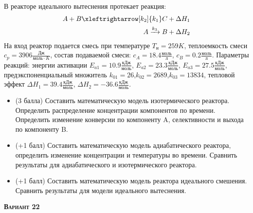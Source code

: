  В реакторе идеального вытеснения протекает реакция: \begin{equation*} \begin{aligned} A+B \xleftrightarrow[k_2]{k_1} C +\Delta H_1 \\ A \xrightarrow{k_3} B + \Delta H_2 \end{aligned} \end{equation*}                                     На вход  реактор подается смесь при температуре $ T_н =  259 K$, теплоемкость смеси $c_p= 3906 \frac{Дж}{моль \cdot K}$, состав подаваемой смеси: $c_A=18.4 \frac{моль}{л}$, $c_B=0.2 \frac{моль}{л}$. Параметры реакций: энергии активации $E_{a1}=10.9 \frac{кДж}{моль}$, $E_{a2}=23.3  \frac{кДж}{моль}$, $E_{a3}=27.5  \frac{кДж}{моль}$, предэкспоненциальный множитель $k_{01}=        26$,$k_{02}=      2689$,$k_{03}=     13834$, тепловой эффект $\Delta H_1= 39.4  \frac{кДж}{моль}$, $\Delta H_2=-36.6 \frac{кДж}{моль}$.\begin{itemize} \item (3 балла) Составить математическую модель изотермического реактора. Определить распределение концентрации компонентов по времени. Определить изменение конверсии по компоненту A, селективности и выхода по компоненту B. \item (+1 балл) Составить математическую модель адиабатического реактора, определить изменение концентрации и температуры во времени. Сравнить результаты для адиабатического и изотермического реактора. \item (+1 балл) Составить математическую модель реактора идеального смешения. Сравнить результаты для модели идеального вытеснения. \end{itemize}

\textsc{\textbf{Вариант 22}}

